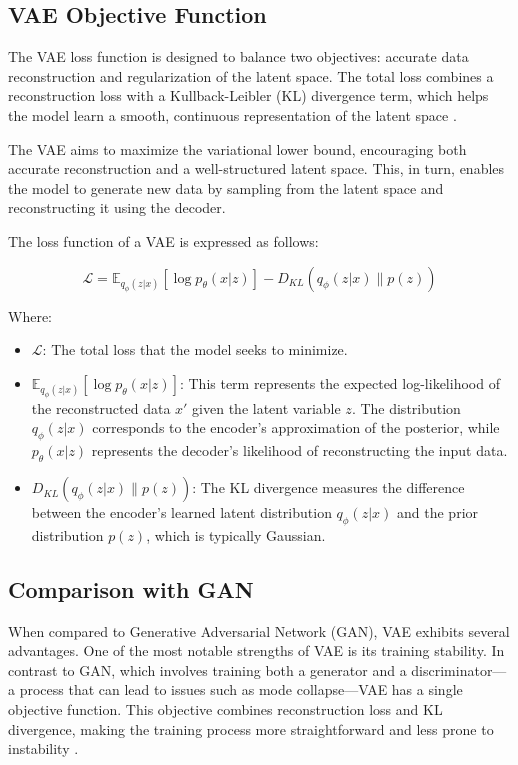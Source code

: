 \subsection{VAE Objective Function}
The VAE loss function is designed to balance two objectives: accurate data reconstruction and regularization of the latent space. The total loss combines a reconstruction loss with a Kullback-Leibler (KL) divergence term, which helps the model learn a smooth, continuous representation of the latent space \citep{10.3390/jimaging4020036}.

The VAE aims to maximize the variational lower bound, encouraging both accurate reconstruction and a well-structured latent space. This, in turn, enables the model to generate new data by sampling from the latent space and reconstructing it using the decoder.

The loss function of a VAE is expressed as follows:

\begin{equation}
\mathcal{L} = \mathbb{E}_{q_\phi(z|x)}[\log p_\theta(x|z)] - D_{KL}(q_\phi(z|x) \| p(z))
\end{equation}

Where:
\begin{itemize}
    \item \(\mathcal{L}\): The total loss that the model seeks to minimize.
    \item \(\mathbb{E}_{q_\phi(z|x)}[\log p_\theta(x|z)]\): This term represents the expected log-likelihood of the reconstructed data \(x'\) given the latent variable \(z\). The distribution \(q_\phi(z|x)\) corresponds to the encoder's approximation of the posterior, while \(p_\theta(x|z)\) represents the decoder's likelihood of reconstructing the input data.
    \item \(D_{KL}(q_\phi(z|x) \| p(z))\): The KL divergence measures the difference between the encoder's learned latent distribution \(q_\phi(z|x)\) and the prior distribution \(p(z)\), which is typically Gaussian.
\end{itemize}

\subsection{Comparison with GAN}

When compared to Generative Adversarial Network (GAN), VAE exhibits several advantages. One of the most notable strengths of VAE is its training stability. In contrast to GAN, which involves training both a generator and a discriminator—a process that can lead to issues such as mode collapse—VAE has a single objective function. This objective combines reconstruction loss and KL divergence, making the training process more straightforward and less prone to instability \citep{10.1561/2200000056}.

